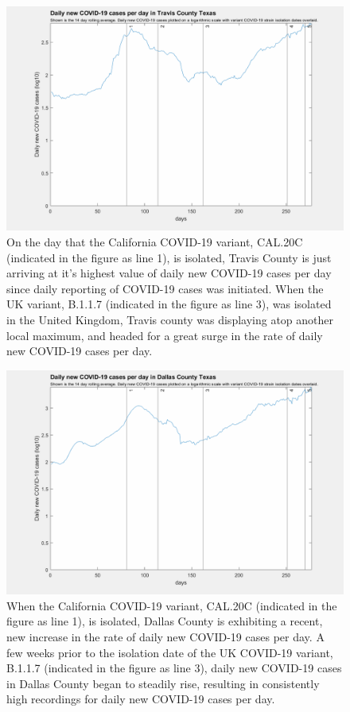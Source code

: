 \documentclass[]{article}
\begin{document}
\begin{figure}[!h]
	\includegraphics[width=\linewidth]{images/travis_cases_strains_log.png}
	\caption{On the day that the California COVID-19 variant, CAL.20C (indicated in the figure as line 1), is isolated, Travis County is just arriving at it's highest value of daily new COVID-19 cases per day since daily reporting of COVID-19 cases was initiated. When the UK variant, B.1.1.7 (indicated in the figure as line 3), was isolated in the United Kingdom, Travis county was displaying atop another local maximum, and headed for a great surge in the rate of daily new COVID-19 cases per day. }
	\label{fig:images/travis_cases_strains_logLabel}
\end{figure}

\begin{figure}[!h]
	\includegraphics[width=\linewidth]{images/dallas_cases_strains_log.png}
	\caption{When the California COVID-19 variant, CAL.20C (indicated in the figure as line 1), is isolated, Dallas County is exhibiting a recent, new increase in the rate of daily new COVID-19 cases per day. A few weeks prior to the isolation date of the UK COVID-19 variant, B.1.1.7 (indicated in the figure as line 3), daily new COVID-19 cases in Dallas County began to steadily rise, resulting in consistently high recordings for daily new COVID-19 cases per day.   }
	\label{fig:images/dallas_cases_strains_logLabel}
\end{figure}
\end{document}
